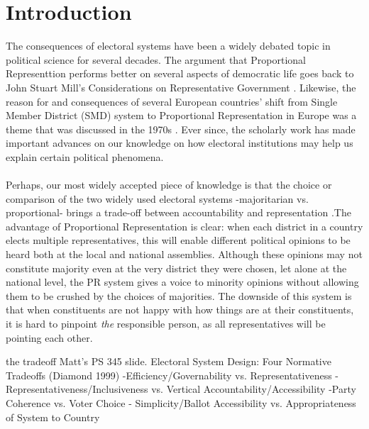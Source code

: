 \documentclass{article}
\begin{document}
\section{Introduction}
The consequences of electoral systems have been a widely debated topic in political science for several decades. The argument that Proportional Representtion performs better on several aspects of democratic life goes back to John Stuart Mill's Considerations on  Representative Government \cite{mill1861considerations}. Likewise, the reason for and consequences of several European countries' shift from Single Member District (SMD) system to Proportional Representation in Europe was a theme that was discussed in the 1970s \cite{rokkan_citizens_1970}. Ever since, the scholarly work has made important advances on our knowledge on how electoral institutions may help us explain certain political phenomena.\\

\\
Perhaps, our most widely accepted piece of knowledge is that the choice or comparison of the two widely used electoral systems -majoritarian vs. proportional- brings a trade-off between accountability and representation \cite{diamond1999developing}\cite{carey_electoral_2011}\cite{persson_economic_2003}.The advantage of Proportional Representation is clear: when each district in a country elects multiple representatives, this will enable different political opinions to be heard both at the local and national assemblies. Although these opinions may not constitute majority even at the very district they were chosen, let alone at the national level, the PR system gives a voice to minority opinions without allowing them to be crushed by the choices of majorities. The downside of this system is that when constituents are not happy with how things are at their constituents, it is hard to pinpoint \textit{the} responsible person, as all representatives will be pointing each other. 




\iffalse the tradeoff
Matt's PS 345 slide. 
Electoral System Design: Four Normative Tradeoffs (Diamond 1999)
-Efficiency/Governability vs. Representativeness
-Representativeness/Inclusiveness vs. Vertical Accountability/Accessibility 
-Party Coherence vs. Voter Choice
- Simplicity/Ballot Accessibility vs. Appropriateness of System to Country
\end{document}
